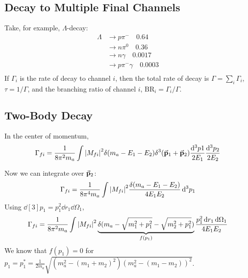\documentclass[a4paper,twoside,master.tex]{subfiles}
\begin{document}
\subsection{Decay to Multiple Final Channels}\label{sub:decay_to_multiple_final_channels}

Take, for example, $ \Lambda $-decay:
\begin{align}
    \Lambda & \to p \pi^- \quad 0.64\\
    & \to n \pi^0 \quad 0.36\\
    & \to n \gamma \quad 0.0017\\
    & \to p \pi^- \gamma \quad 0.0003\\
\end{align}
If $ \Gamma_i $ is the rate of decay to channel $ i $, then the total rate of decay is $ \Gamma = \sum_i \Gamma_i $, $ \tau = 1 / \Gamma $, and the branching ratio of channel $ i $, $ \text{BR}_i = \Gamma_i / \Gamma $.

\subsection{Two-Body Decay}\label{sub:two-body_decay}

In the center of momentum,
\begin{equation}
    \Gamma_{f i} = \frac{1}{8 \pi^2 m_a} \int \abs{M_{f i}}^2 \delta(m_a - E_1 - E_2) \delta^3(\va{p}_1 + \va{p}_2) \frac{\dd[3]{p1}}{2E_1} \frac{\dd[3]{p_2}}{2 E_2}
\end{equation}

Now we can integrate over $ \va{p}_2 $: 
\begin{equation}
    \Gamma_{f i} = \frac{1}{8 \pi^4 m_a} \int \abs{M_{f i}}^2 \frac{\delta(m_a - E_1 - E_2)}{4 E_1 E_2} \dd[3]{p_1}
\end{equation}
Using $ \dd[3]{p_1} = p_1^2 \dd{r_1} \dd{\Omega_1} $,
\begin{equation}
    \Gamma_{f i} = \frac{1}{8 \pi^2 m_a} \int \abs{M_{f i}}^2 \underbrace{\delta(m_a - \sqrt{m_1^2 + p_1^2} - \sqrt{m_2^2 + p_1^2})}_{f(p_1)} \frac{p_1^2 \dd{r_1} \dd{\Omega_1}}{4 E_1 E_2}
\end{equation}
We know that $ f(p_1) = 0 $ for $ p_1 = p_1^* = \frac{1}{2 m_a} \sqrt{(m_a^2 - (m_1 + m_2)^2)(m_a^2 - (m_1 - m_2))^2} $.
\end{document}
